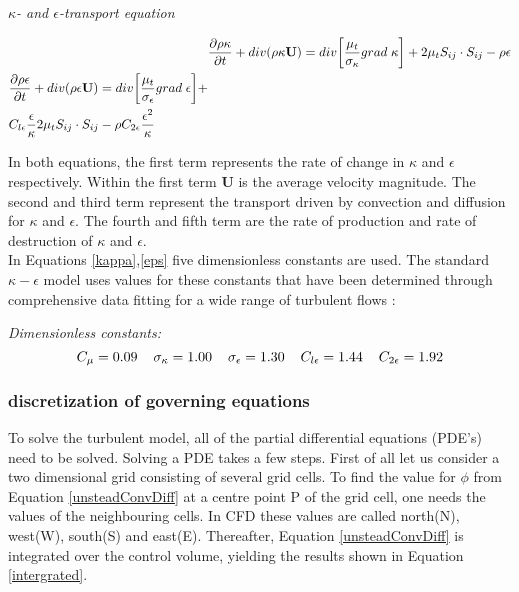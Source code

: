 \documentclass{CFD2017}
\begin{document}
\emph{$\kappa$- and $\epsilon$-transport equation}

\begin{align}
&\frac{\partial \rho \kappa}{\partial t} + div(\rho \kappa \mathbf{U}) = div\bigg[\frac{\mu_t}{\sigma_{\kappa}}grad\hspace{1mm}\kappa\bigg] +2\mu_tS_{ij}\cdot S_{ij}-\rho\epsilon \label{kappa}\\
\begin{split}
&\frac{\partial \rho \epsilon}{\partial t} + div(\rho \epsilon \mathbf{U}) = div\bigg[\frac{\mu_t}{\sigma_{\epsilon}}grad\hspace{1mm}\epsilon\bigg] +\\
&C_{l\epsilon} \frac{\epsilon}{\kappa}2\mu_tS_{ij}\cdot S_{ij}-\rho C_{2\epsilon}\frac{\epsilon^2}{\kappa} \label{eps}
\end{split}
\end{align}

In both equations, the first term represents the rate of change in $\kappa$ and $\epsilon$ respectively. Within the first term $\mathbf{U}$ is the average velocity magnitude. The second and third term represent the transport driven by convection and diffusion for $\kappa$ and $\epsilon$. The fourth and fifth term are the rate of production and rate of destruction of $\kappa$ and $\epsilon$.\\
In Equations \ref{kappa},\ref{eps} five dimensionless constants are used. The standard $\kappa-\epsilon$ model uses values for these constants that have been determined through comprehensive data fitting for a wide range of turbulent flows \cite{Versteeg2007}:\vspace{2mm}

\emph{Dimensionless constants:}
\begin{equation*}
\label{dimConst}
C_{\mu}=0.09 \hspace{4mm} \sigma_{\kappa}=1.00\hspace{4mm}\sigma_{\epsilon}=1.30\hspace{4mm}C_{l\epsilon}=1.44\hspace{4mm}C_{2\epsilon}=1.92
\end{equation*}


\subsubsection{discretization of governing equations}
To solve the turbulent model, all of the partial differential equations (PDE's) need to be solved. Solving a PDE takes a few steps. First of all let us consider a two dimensional grid consisting of several grid cells. To find the value for $\phi$ from Equation \ref{unsteadConvDiff} at a centre point P of the grid cell, one needs the values of the neighbouring cells. In CFD these values are called north(N), west(W), south(S) and east(E). Thereafter, Equation \ref{unsteadConvDiff} is integrated over the control volume, yielding the results shown in Equation \ref{intergrated}.\vspace{2mm}
\end{document}
